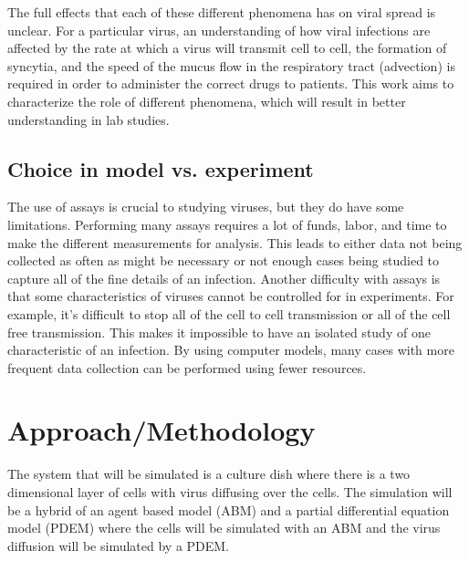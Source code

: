 \documentclass[a4paper]{article}
\begin{document}
The full effects that each of these different phenomena has on viral spread is unclear. For a particular virus, an understanding of how viral infections are affected by the rate at which a virus will transmit cell to cell, the formation of syncytia, and the speed of the mucus flow in the respiratory tract (advection) is required in order to administer the correct drugs to patients. This work aims to characterize the role of different phenomena, which will result in better understanding in lab studies.

\subsection{Choice in model vs. experiment}
The use of assays is crucial to studying viruses, but they do have some limitations. Performing many assays requires a lot of funds, labor, and time to make the different measurements for analysis. This leads to either data not being collected as often as might be necessary or not enough cases being studied to capture all of the fine details of an infection. Another difficulty with assays is that some characteristics of viruses cannot be controlled for in experiments. For example, it's difficult to stop all of the cell to cell transmission or all of the cell free transmission. This makes it impossible to have an isolated study of one characteristic of an infection. By using computer models, many cases with more frequent data collection can be performed using fewer resources.

\section{Approach/Methodology}

The system that will be simulated is a culture dish where there is a two dimensional layer of cells with virus diffusing over the cells. The simulation will be a hybrid of an agent based model (ABM) and a partial differential equation model (PDEM) where the cells will be simulated with an ABM and the virus diffusion will be simulated by a PDEM.
\\
\end{document}
